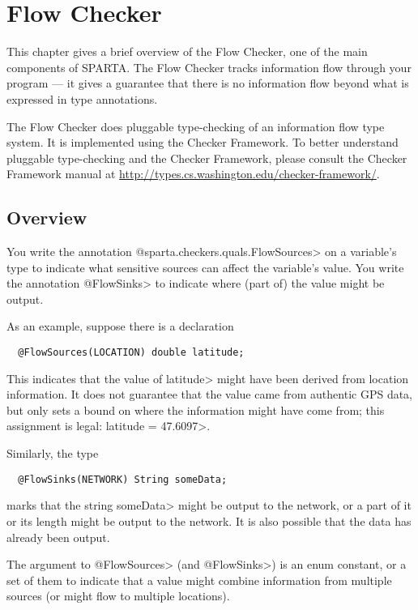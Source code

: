\htmlhr
\chapter{Flow Checker\label{flow-checker}}

This chapter gives a brief overview of the Flow Checker, one of
the main components of SPARTA\@.  The Flow Checker tracks information flow
through your program --- it gives a guarantee that there is no information
flow beyond what is expressed in type annotations.

The Flow Checker does pluggable type-checking of an information flow type
system.  It is implemented using the Checker Framework.  To better
understand pluggable type-checking and the Checker Framework, please
consult the Checker Framework manual at
\url{http://types.cs.washington.edu/checker-framework/}.  

\section{Overview}

You write the annotation \<@sparta.checkers.quals.FlowSources> on a variable's
type to indicate what sensitive sources can affect the variable's value.
You write the annotation \<@FlowSinks> to indicate where (part of) the
value might be output.

As an example, suppose there is a declaration
\begin{Verbatim}
  @FlowSources(LOCATION) double latitude;
\end{Verbatim}
\noindent
This indicates that the value of \<latitude> might have been derived from
location information.  It does not guarantee that the value came from
authentic GPS data, but only sets a bound on where the information might
have come from; this assignment is legal: \<latitude = 47.6097>.

Similarly, the type
\begin{Verbatim}
  @FlowSinks(NETWORK) String someData;
\end{Verbatim}
\noindent
marks that the string \<someData> might be output to the network, or a part
of it or its length might be output to the network.  It is also possible
that the data has already been output.

The argument to \<@FlowSources> (and \<@FlowSinks>) is an enum constant, or a
set of them to indicate that a value might combine information from
multiple sources (or might flow to multiple locations).


